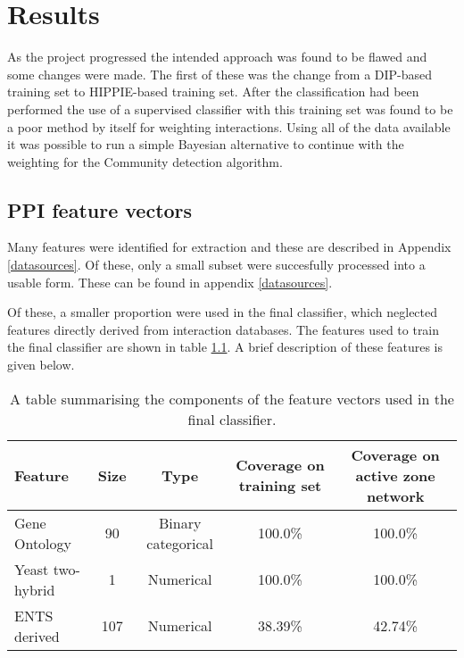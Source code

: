 \chapter{Results}
\label{results}


As the project progressed the intended approach was found to be flawed and some changes were made.
The first of these was the change from a DIP-based training set to HIPPIE-based training set.
After the classification had been performed the use of a supervised classifier with this training set was found to be a poor method by itself for weighting interactions.
Using all of the data available it was possible to run a simple Bayesian alternative to continue with the weighting for the Community detection algorithm.

\section{PPI feature vectors}

Many features were identified for extraction and these are described in Appendix \ref{datasources}.
Of these, only a small subset were succesfully processed into a usable form.
These can be found in appendix \ref{datasources}.

Of these, a smaller proportion were used in the final classifier, which neglected features directly derived from interaction databases.
The features used to train the final classifier are shown in table \ref{tab:features}.
A brief description of these features is given below.

\begin{table}
    \centering
    \begin{tabular}{l c c c c}
        \small
        Feature         &   Size &  Type                &  Coverage on training set &  Coverage on active zone network \\
        \hline
        Gene Ontology    &  90   &  Binary categorical  &  100.0\%                  & 100.0\%                          \\
        Yeast two-hybrid &  1    &  Numerical           &  100.0\%                  & 100.0\%                          \\
        ENTS derived     &  107  &  Numerical           &  38.39\%                  & 42.74\%                          \\
    \end{tabular}
    \caption{A table summarising the components of the feature vectors used in the final classifier.}
    \label{tab:features}
\end{table}

